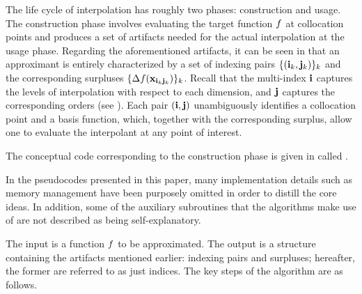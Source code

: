 The life cycle of interpolation has roughly two phases: construction and usage.
The construction phase involves evaluating the target function $f$ at
collocation points and produces a set of artifacts needed for the actual
interpolation at the usage phase. Regarding the aforementioned artifacts, it can
be seen in  that an approximant is entirely
characterized by a set of indexing pairs $\{ (\mathbf{i}_k, \mathbf{j}_k) \}_k$ and the
corresponding surpluses $\{ \Delta f(\mathbf{x}_{\mathbf{i}_k \mathbf{j}_k}) \}_k$. Recall that the
multi-index $\mathbf{i}$ captures the levels of interpolation with respect to each
dimension, and $\mathbf{j}$ captures the corresponding orders (see
). Each pair $(\mathbf{i}, \mathbf{j})$ unambiguously identifies a
collocation point and a basis function, which, together with the corresponding
surplus, allow one to evaluate the interpolant at any point of interest.


The conceptual code corresponding to the construction phase is given in
 called .

\begin{remark}
In the pseudocodes presented in this paper, many implementation details such as
memory management have been purposely omitted in order to distill the core
ideas. In addition, some of the auxiliary subroutines that the algorithms make
use of are not described as being self-explanatory.
\end{remark}

The input  is a function $f$ to be approximated. The output
 is a structure containing the artifacts mentioned earlier:
indexing pairs and surpluses; hereafter, the former are referred to as just
indices. The key steps of the  algorithm are as follows.

